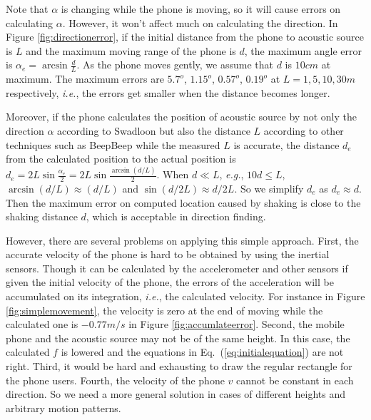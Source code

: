 \documentclass[]{sig-alternate-10pt}
\def\ie{\textit{i.e.}\xspace}
\def\eg{\textit{e.g.}\xspace}
\newcommand{\eqqref}[1]{Eq.~(\ref{#1})}
\def \ourprotocol{Swadloon\xspace}
\begin{document}
Note that $\alpha$ is changing while the phone is moving, so it will
cause errors on calculating $\alpha$. However, it won't affect much
on calculating the direction. In Figure \ref{fig:directionerror}, if the initial distance from the
phone to acoustic source is $L$ and the maximum moving range of the
phone is $d$, the maximum angle error is
$    \alpha_e=\arcsin \frac{d}{L}.$
As the phone moves gently, we assume that $d$ is $10cm$ at maximum.
The maximum errors are $5.7^o$, $1.15^o$, $0.57^o$, $0.19^o$ at $L=1, 5, 10,
30m$ respectively, \ie,
the errors get smaller when the distance becomes longer.

Moreover, if the phone calculates
the position of acoustic source by not only the direction $\alpha$
according to \ourprotocol but also the distance $L$ according to other
techniques such as BeepBeep
\cite{2007-SenSys-BeepBeephighaccuracy} while the measured
$L$ is accurate, the distance $d_e$  from the calculated position to the actual position is
$ d_e=2L\sin\frac{\alpha_e}{2}=2L\sin\frac{\arcsin(d/L) }{2}$.
When $d\ll L$, \eg, $10d\leq L$, $\arcsin(d/L)\approx (d/L)$ and
$\sin(d/2L)\approx d/2L$. So we simplify $d_e$ as
$ d_e\approx d$.
Then the maximum error on computed location caused by shaking is 
close to the shaking distance $d$, which is acceptable in direction finding.

However, there are several problems on applying this simple approach.
First, the accurate velocity of the phone is hard to be  obtained by
using the inertial sensors. Though it can be calculated by the
accelerometer and other sensors if given the initial velocity of the
phone, the errors of the acceleration will be accumulated on its
integration, \ie, the calculated velocity. For instance in Figure
\ref{fig:simplemovement}, the velocity is zero at the end of moving
while the calculated one is $-0.77m/s$ in Figure \ref{fig:accumlateerror}. Second, the mobile
phone and the acoustic source may not be of the same height. In this
case, the calculated $f$ is lowered and the equations in
\eqqref{eq:initialequation} are not right. Third, it would be hard and
exhausting to draw the regular rectangle  for the
phone users. Fourth, the velocity of the phone $v$ cannot be constant in each
direction.
So we  need a more general solution in cases of different heights and
arbitrary motion patterns.
\end{document}
